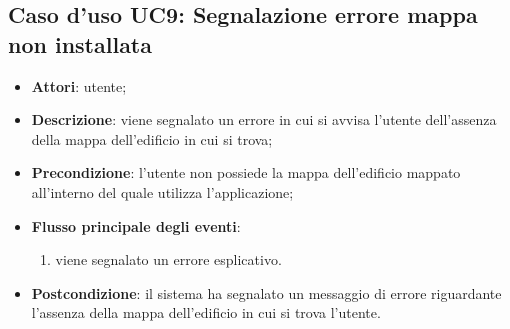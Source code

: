 \documentclass[../AnalisiDeiRequisiti.tex]{subfiles}
\begin{document}
\subsection{Caso d'uso UC9: Segnalazione errore mappa non installata}
\begin{itemize}
	\item \textbf{Attori}: utente;
	\item \textbf{Descrizione}: viene segnalato un errore in cui si avvisa l'utente dell'assenza della mappa dell'edificio in cui si trova; 
	\item \textbf{Precondizione}: l'utente non possiede la mappa dell'edificio mappato all'interno del quale utilizza l'applicazione;
	
	\item \textbf{Flusso principale degli eventi}:
	\begin{enumerate}
		\item viene segnalato un errore esplicativo.
		
	\end{enumerate}
	\item \textbf{Postcondizione}: il sistema ha segnalato un messaggio di errore riguardante l'assenza della mappa dell'edificio in cui si trova l'utente.
\end{itemize}
\end{document}
